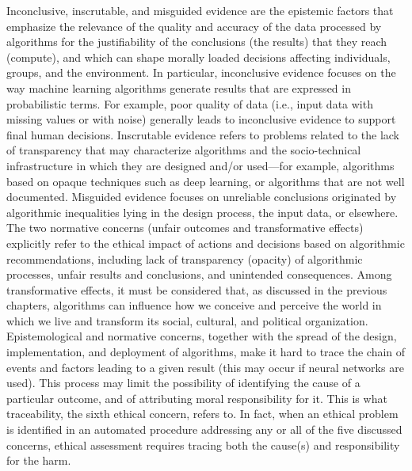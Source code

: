 Inconclusive, inscrutable, and misguided evidence are the epistemic factors that emphasize the relevance of the quality and accuracy of the data processed by algorithms for the justifiability of the conclusions (the results) that they reach (compute), and which can shape morally loaded decisions affecting individuals, groups, and the environment. In particular, inconclusive evidence focuses on the way machine learning algorithms generate results that are expressed in probabilistic terms. For example, poor quality of data (i.e., input data with missing values or with noise) generally leads to inconclusive evidence to support final human decisions. Inscrutable evidence refers to problems related to the lack of transparency that may characterize algorithms and the socio-technical infrastructure in which they are designed and/or used---for example, algorithms based on opaque techniques such as deep learning, or algorithms that are not well documented. Misguided evidence focuses on unreliable conclusions originated by algorithmic inequalities lying in the design process, the input data, or elsewhere. The two normative concerns (unfair outcomes and transformative effects) explicitly refer to the ethical impact of actions and decisions based on algorithmic recommendations, including lack of transparency (opacity) of algorithmic processes, unfair results and conclusions, and unintended consequences. Among transformative effects, it must be considered that, as discussed in the previous chapters, algorithms can influence how we conceive and perceive the world in which we live and transform its social, cultural, and political organization. Epistemological and normative concerns, together with the spread of the design, implementation, and deployment of algorithms, make it hard to trace the chain of events and factors leading to a given result (this may occur if neural networks are used). This process may limit the possibility of identifying the cause of a particular outcome, and of attributing moral responsibility for it. This is what traceability, the sixth ethical concern, refers to. In fact, when an ethical problem is identified in an automated procedure addressing any or all of the five discussed concerns, ethical assessment requires tracing both the cause(s) and responsibility for the harm.

